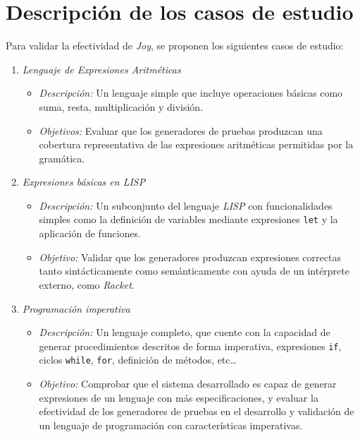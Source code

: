 \documentclass[11pt]{article}
\begin{document}
\section*{Descripción de los casos de estudio}

Para validar la efectividad de \textit{Joy}, se proponen los siguientes casos de estudio:

\begin{enumerate}
\item \textit{Lenguaje de Expresiones Aritméticas}

  \begin{itemize}
  \item \textit{Descripción:} Un lenguaje simple que incluye operaciones básicas como suma, resta, multiplicación y división.
  \item \textit{Objetivos:} Evaluar que los generadores de pruebas produzcan una cobertura representativa de las expresiones aritméticas permitidas por la gramática.
  \end{itemize}
  
\item \textit{Expresiones básicas en LISP}

  \begin{itemize}
  \item \textit{Descripción:} Un subconjunto del lenguaje \textit{LISP} con funcionalidades simples como la definición de variables mediante expresiones \texttt{let} y la aplicación de funciones.
  \item \textit{Objetivo:} Validar que los generadores produzcan expresiones correctas tanto sintácticamente como semánticamente con ayuda de un intérprete externo, como \textit{Racket}.
  \end{itemize}

\item \textit{Programación imperativa}

  \begin{itemize}
  \item \textit{Descripción:} Un lenguaje completo, que cuente con la capacidad de generar procedimientos descritos de forma imperativa, expresiones \texttt{if}, ciclos \texttt{while}, \texttt{for}, definición de métodos, etc\ldots
  \item \textit{Objetivo:} Comprobar que el sistema desarrollado es capaz de generar expresiones de un lenguaje con más especificaciones, y evaluar la efectividad de los generadores de pruebas en el desarrollo y validación de un lenguaje de programación con características imperativas.
  \end{itemize}
  
\end{enumerate}
\end{document}
